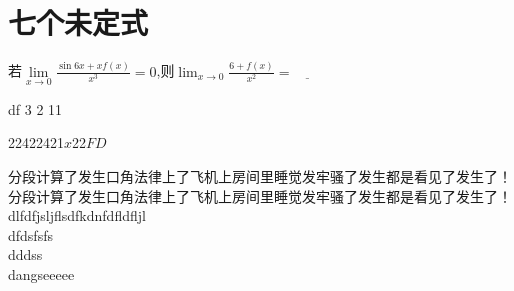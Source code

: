 \section{七个未定式}

\begin{multicols}{2}
\begin{examples}
		若$\lim\limits_{x\to0}{\frac{\sin{6x}+xf(x)}{x^3}}=0$,则$\lim_{x\to0}{\frac{6+f(x)}{x^2}}=\underline{\qquad}$

\end{examples}
\choiceitem
			{df}
			{3}
			{2}
			{11}
			\begin{options}
				{224}{22421$x$}{22}{$FD$}
			\end{options}
			分段计算了发生口角法律上了飞机上房间里睡觉发牢骚了发生都是看见了发生了！
			分段计算了发生口角法律上了飞机上房间里睡觉发牢骚了发生都是看见了发生了！\\
	dlfdfjsljflsdfkdnfdfldfljl \\
	dfdsfsfs \\
	dddss\\
	dangseeeee
\end{multicols}

